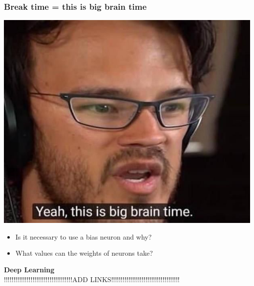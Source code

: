 \documentclass[12pt, aspectratio = 169]{beamer}
\begin{document}
\begin{frame}
	\frametitle{Break time = this is big brain time}
	\centering
	\includegraphics[width=0.4\linewidth]{big_brain_time.jpg}\\
	\begin{itemize}
    	\centering
	    \item Is it necessary to use a bias neuron and why?
	    \item What values can the weights of neurons take?
	\end{itemize}
\end{frame}


\begin{frame}
	\centering
	\large \textbf{Deep Learning}\\
	!!!!!!!!!!!!!!!!!!!!!!!!!!!!!!!!!!!!ADD LINKS!!!!!!!!!!!!!!!!!!!!!!!!!!!!!!!!!!!!
\end{frame}

\end{document}
